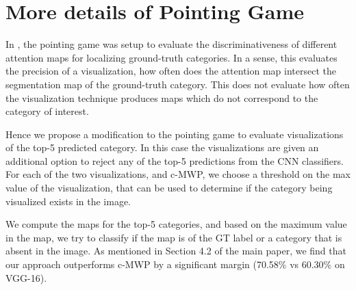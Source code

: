 \vspace{-10pt}
\section{More details of Pointing Game}\label{sec:sup_pointing}

In \cite{zhang2016top}, the pointing game was setup to evaluate the discriminativeness of different attention maps for localizing ground-truth categories. In a sense, this evaluates the precision of a visualization, \ie how often does the attention map intersect the segmentation map of the ground-truth category.
This does not evaluate how often the visualization technique produces maps which do not correspond to the category of interest. 

Hence we propose a modification to the pointing game to evaluate visualizations of the top-5 predicted category.
In this case the visualizations are given an additional option to reject any of the top-5 predictions from the CNN classifiers.
For each of the two visualizations, \gcam{} and c-MWP, we choose a threshold on the max value of the visualization, that can be used to determine if the category being visualized exists in the image.

We compute the maps for the top-5 categories, and based on the maximum value in the map, we try to classify if the map is of the GT label or a category that is absent in the image.
As mentioned in Section 4.2 of the main paper, we find that our approach \gcam{} outperforms c-MWP by a significant margin (70.58\% vs 60.30\% on VGG-16).





